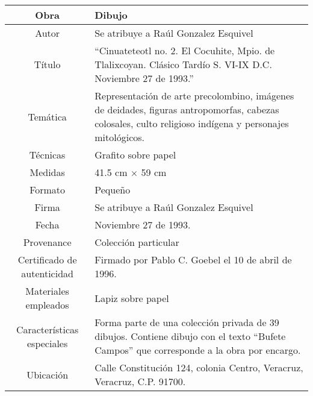 \documentclass[10pt,letter]{report}
\begin{document}
\begin{table}[H]
\centering
\begin{tabular}{|c|m{}|}
\hline
Obra& Dibujo	\\
\hline
Autor & Se atribuye a Ra\'ul Gonzalez Esquivel\\
\hline
T\'itulo & ``Cinuateteotl no. 2. El Cocuhite, Mpio. de Tlalixcoyan. Cl\'asico Tard\'io S. VI-IX D.C. Noviembre 27 de 1993.''\\
\hline
Tem\'atica & Representaci\'on de arte precolombino, im\'agenes de deidades, figuras antropomorfas, cabezas colosales, culto religioso ind\'igena y personajes mitol\'ogicos.\\
\hline
T\'ecnicas &Grafito sobre papel \\
\hline
Medidas & 41.5 cm $\times$ 59 cm \\
\hline
 Formato & Peque\~no \\
 \hline
 Firma & Se atribuye a Ra\'ul Gonzalez Esquivel\\ 
 \hline
  Fecha & Noviembre 27 de 1993.\\
 \hline
 Provenance & Colecci\'on particular\\
 \hline
 Certificado de autenticidad& Firmado por Pablo C. Goebel el 10 de abril de 1996.  \\
 \hline 
  Materiales empleados & Lapiz sobre papel\\
 \hline
 Caracter\'isticas especiales & Forma parte de una colecci\'on privada de 39 dibujos. 
Contiene dibujo con el texto ``Bufete Campos'' que corresponde a la obra por encargo. \\
\hline 
Ubicaci\'on & Calle Constituci\'on 124, colonia Centro, Veracruz, Veracruz, C.P. 91700.\\
\hline

\end{tabular}
\end{table}
\end{document}
